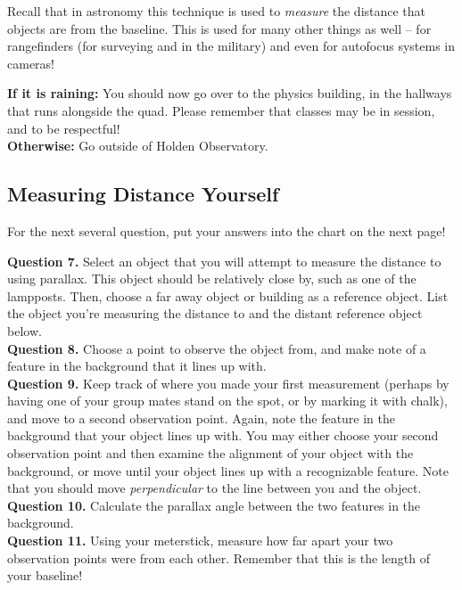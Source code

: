 \documentclass[11pt]{article}
\begin{document}
Recall that in astronomy this technique is used to {\it measure} the distance that objects are from the baseline. This is used for many other things as well -- for rangefinders (for surveying and in the military) and even for autofocus systems in cameras!

\textbf{If it is raining:} You should now go over to the physics building, in the hallways that runs alongside the quad. Please remember that classes may be in session, and to be respectful!\\

\textbf{Otherwise:} Go outside of Holden Observatory.

\newpage

\subsection{Measuring Distance Yourself}
For the next several question, put your answers into the chart on the next page!

\textbf{Question 7.} Select an object that you will attempt to measure the distance to using parallax. This object should be relatively close by, such as one of the lampposts. Then, choose a far away object or building as a reference object. List the object you're measuring the distance to and the distant reference object below.\\

\textbf{Question 8.} Choose a point to observe the object from, and make note of a feature in the background that it lines up with.\\

\textbf{Question 9.} Keep track of where you made your first measurement (perhaps by having one of your group mates stand on the spot, or by marking it with chalk), and move to a second observation point. Again, note the feature in the background that your object lines up with. You may either choose your second observation point and then examine the alignment of your object with the background, or move until your object lines up with a recognizable feature. Note that you should move {\it perpendicular} to the line between you and the object.\\

\textbf{Question 10.} Calculate the parallax angle between the two features in the background.\\

\textbf{Question 11.} Using your meterstick, measure how far apart your two observation points were from each other. Remember that this is the length of your baseline!\\
\end{document}
